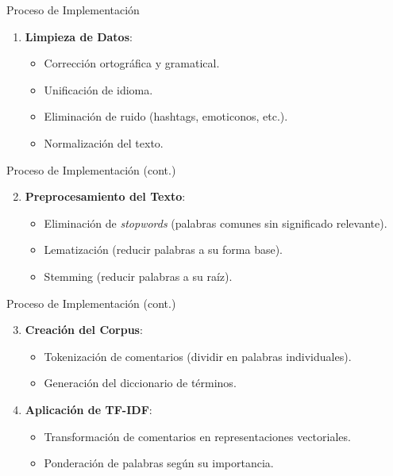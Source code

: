 \documentclass[aspectratio=169, xcolor={dvipsnames}, 10pt, spanish]{beamer}
\begin{document}
\begin{frame}{Proceso de Implementación}
    \begin{enumerate}
        \item \textbf{Limpieza de Datos}:
        \begin{itemize}
            \item Corrección ortográfica y gramatical.
            \item Unificación de idioma.
            \item Eliminación de ruido (hashtags, emoticonos, etc.).
            \item Normalización del texto.
        \end{itemize}
    \end{enumerate}
\end{frame}

\begin{frame}{Proceso de Implementación (cont.)}
    \begin{enumerate}
        \setcounter{enumi}{1}
        \item \textbf{Preprocesamiento del Texto}:
        \begin{itemize}
            \item Eliminación de \textit{stopwords} (palabras comunes sin significado relevante).
            \item Lematización (reducir palabras a su forma base).
            \item Stemming (reducir palabras a su raíz).
        \end{itemize}
    \end{enumerate}
\end{frame}

\begin{frame}{Proceso de Implementación (cont.)}
    \begin{enumerate}
        \setcounter{enumi}{2}
        \item \textbf{Creación del Corpus}:
        \begin{itemize}
            \item Tokenización de comentarios (dividir en palabras individuales).
            \item Generación del diccionario de términos.
        \end{itemize}
        \item \textbf{Aplicación de TF-IDF}:
        \begin{itemize}
            \item Transformación de comentarios en representaciones vectoriales.
            \item Ponderación de palabras según su importancia.
        \end{itemize}
    \end{enumerate}
\end{frame}
\end{document}
